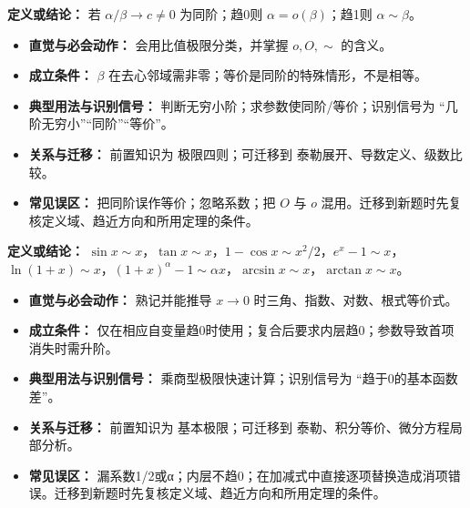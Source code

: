 \begin{knowledgeBox}
\textbf{定义或结论：} 若 $\alpha/\beta\to c\ne0$ 为同阶；趋0则 $\alpha=o(\beta)$；趋1则 $\alpha\sim\beta$。

\begin{itemize}
  \item \textbf{直觉与必会动作：} 会用比值极限分类，并掌握 $o,O,\sim$ 的含义。
  \item \textbf{成立条件：} $\beta$ 在去心邻域需非零；等价是同阶的特殊情形，不是相等。
  \item \textbf{典型用法与识别信号：} 判断无穷小阶；求参数使同阶/等价；识别信号为 “几阶无穷小”“同阶”“等价”。
  \item \textbf{关系与迁移：} 前置知识为 极限四则；可迁移到 泰勒展开、导数定义、级数比较。
  \item \textbf{常见误区：} 把同阶误作等价；忽略系数；把 $O$ 与 $o$ 混用。迁移到新题时先复核定义域、趋近方向和所用定理的条件。
\end{itemize}
\end{knowledgeBox}

\begin{knowledgeBox}
\textbf{定义或结论：} $\sin x\sim x$，$\tan x\sim x$，$1-\cos x\sim x^2/2$，$e^x-1\sim x$，$\ln(1+x)\sim x$，$(1+x)^\alpha-1\sim\alpha x$，$\arcsin x\sim x$，$\arctan x\sim x$。

\begin{itemize}
  \item \textbf{直觉与必会动作：} 熟记并能推导 $x\to0$ 时三角、指数、对数、根式等价式。
  \item \textbf{成立条件：} 仅在相应自变量趋0时使用；复合后要求内层趋0；参数导致首项消失时需升阶。
  \item \textbf{典型用法与识别信号：} 乘商型极限快速计算；识别信号为 “趋于0的基本函数差”。
  \item \textbf{关系与迁移：} 前置知识为 基本极限；可迁移到 泰勒、积分等价、微分方程局部分析。
  \item \textbf{常见误区：} 漏系数1/2或α；内层不趋0；在加减式中直接逐项替换造成消项错误。迁移到新题时先复核定义域、趋近方向和所用定理的条件。
\end{itemize}
\end{knowledgeBox}

